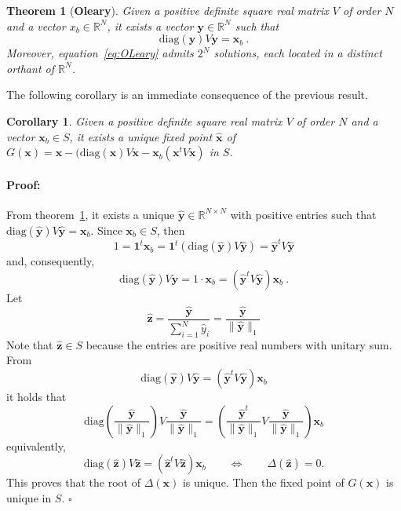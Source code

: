 \documentclass[preprint,11pt,authoryear]{elsarticle}
\newtheorem{theorem}{Theorem}%
\newtheorem{corollary}{Corollary}
\newenvironment{proof}{\paragraph{Proof:}}{\hfill$\square$}
\begin{document}
\begin{theorem}[\textbf{Oleary}] \label{th:Oleary}
Given a positive definite square real matrix $V$ of order $N$ and a vector $x_b \in \mathbb{R}^N$, it exists a vector
$\mathbf{y} \in \mathbb R^N$ such that 
\begin{equation}\label{eq:OLeary}
\textrm{diag}(\mathbf{y}) V \mathbf{y} = \mathbf{x}_b \ .
\end{equation}
Moreover, equation~\eqref{eq:OLeary} admits $2^N$ solutions, each located in a distinct orthant of $\mathbb{R}^N$.
\end{theorem}
The following corollary is an immediate consequence of the previous result.
\begin{corollary}
Given a positive definite square real matrix $V$ of order $N$ and a vector $\mathbf{x}_b \in S$, it exists a unique fixed point $ \mathbf{\widehat{x}}$ of $G(\mathbf{x})=\mathbf{x}-(\textrm{diag}(\mathbf{x})V\mathbf{x}-\mathbf{x}_b(\mathbf{x}^tV\mathbf{x}) $ in $S$. 
\end{corollary}

\begin{proof}
From theorem~\ref{th:Oleary}, it exists a unique $ \mathbf{\widehat{y}} \in \mathbb R^{N\times N}$ with positive entries such that $\textrm{diag}( \mathbf{\widehat{y}}) V  \mathbf{\widehat{y}} = \mathbf{x}_b $.
Since $\mathbf{x}_b \in S$, then
$$1= \mathbf 1^t \mathbf{x}_b =  \mathbf 1^t(\textrm{diag}( \mathbf{\widehat{y}}) V  \mathbf{\widehat{y}})=  \mathbf{\widehat{y}}^tV  \mathbf{\widehat{y}}$$
and, consequently, 
$$\textrm{diag}( \mathbf{\widehat{y}}) V  \mathbf{\widehat{y}} = 1\cdot \mathbf{x}_b= \left ( \mathbf{\widehat{y}} ^tV \mathbf{\widehat{y}} \right ) \mathbf{x}_b \ .$$
Let 
$$ \mathbf{\widehat{z}}=\frac{ \mathbf{\widehat{y}}}{\sum_{i=1}^N \widehat y_i} =\frac{ \mathbf{\widehat{y}}}{\|  \mathbf{\widehat{y}}\|_1}$$Note that $ \mathbf{\widehat{z}} \in S$ because the entries are positive real numbers with unitary sum.
From 
$$\textrm{diag}( \mathbf{\widehat{y}}) V  \mathbf{\widehat{y}} =  \left ( \mathbf{\widehat{y}}^tV  \mathbf{\widehat{y}} \right ) \mathbf{x}_b$$
 it holds that
$$ \textrm{diag}\left (\frac{ \mathbf{\widehat{y}}}{\| \mathbf{\widehat{y}}\|_1}\right ) V \frac{ \mathbf{\widehat{y}}}{\| \mathbf{\widehat{y}}\|_1}  =  \left (\frac{ \mathbf{\widehat{y}}^t}{\| \mathbf{\widehat{y}}\|_1}V\frac{ \mathbf{\widehat{y}}}{\|   \mathbf{\widehat{y}}\|_1}\right ) \mathbf{x}_b $$
equivalently, 
$$\textrm{diag}( \mathbf{\widehat{z}}) V  \mathbf{\widehat{z}} = \left ( \mathbf{\widehat{z}}^tV \mathbf{\widehat{z}}\right ) \mathbf{x}_b\qquad \Leftrightarrow \qquad \Delta( \mathbf{\widehat{z}})=0. $$
This proves that the root of $\Delta(\mathbf{x})$ is unique. Then the fixed point of $G(\mathbf{x})$ is unique in $S$.
\end{proof}
\end{document}
